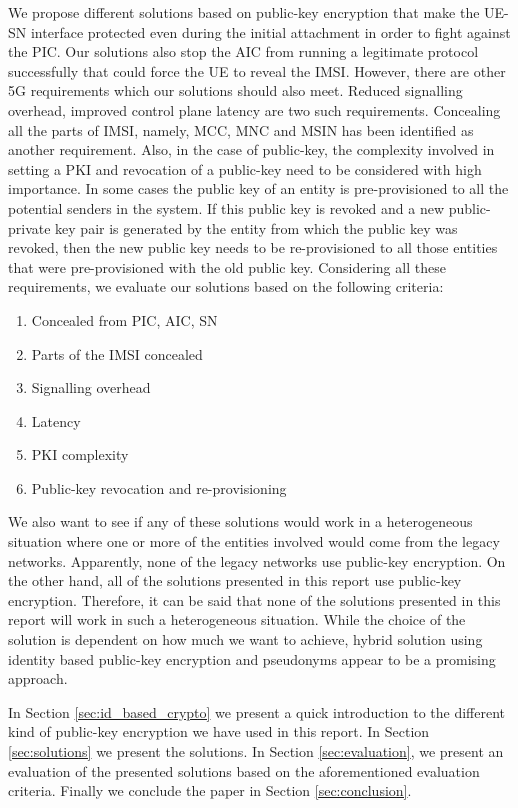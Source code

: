\documentclass[lnicst,sechang,a4paper]{svmultln}
\begin{document}
We propose different solutions based on public-key encryption that make the UE-SN interface protected even during the initial attachment in order to fight against the PIC. Our solutions also stop the AIC from running a legitimate protocol successfully that could force the UE to reveal the IMSI. However, there are other 5G requirements which our solutions should also meet. Reduced signalling overhead, improved control plane latency are two such requirements. Concealing all the parts of IMSI, namely, MCC, MNC and MSIN has been identified as another requirement. Also, in the case of public-key, the complexity involved in setting a PKI and revocation of a public-key need to be considered with high importance. In some cases the public key of an entity is pre-provisioned to all the potential senders in the system. If this public key is revoked and a new public-private key pair is generated by the entity from which the public key was revoked, then the new public key needs to be re-provisioned to all those entities that were pre-provisioned with the old public key. Considering all these requirements, we evaluate our solutions based on the following criteria:
\begin{enumerate}
\item Concealed from PIC, AIC, SN
\item Parts of the IMSI concealed
\item Signalling overhead
\item Latency
\item PKI complexity
\item Public-key revocation and re-provisioning 
\end{enumerate}

We also want to see if any of these solutions would work in a heterogeneous situation where one or more of the entities involved would come from the legacy networks. Apparently, none of the legacy networks use public-key encryption. On the other hand, all of the solutions presented in this report use public-key encryption. Therefore, it can be said that none of the solutions presented in this report will work in such a heterogeneous situation. While the choice of the solution is dependent on how much we want to achieve, hybrid solution using identity based public-key encryption and pseudonyms appear to be a promising approach.

In Section \ref{sec:id_based_crypto} we present a quick introduction to the different kind of public-key encryption we have used in this report. In Section \ref{sec:solutions} we present the solutions. In Section \ref{sec:evaluation}, we present an evaluation of the presented solutions based on the aforementioned evaluation criteria. Finally we conclude the paper in Section \ref{sec:conclusion}.
\end{document}
